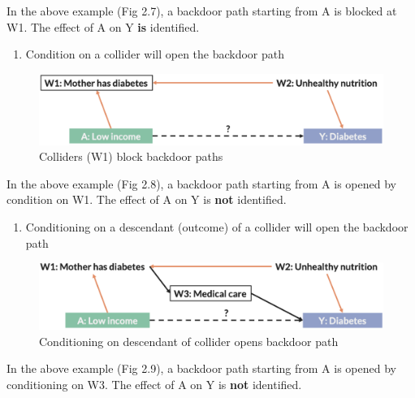 \documentclass[
]{book}
\providecommand{\tightlist}{%
  \setlength{\itemsep}{0pt}\setlength{\parskip}{0pt}}
\begin{document}
In the above example (Fig 2.7), a backdoor path starting from A is blocked at W1. The effect of A on Y \textbf{is} identified.

\begin{enumerate}
\def\labelenumi{\arabic{enumi}.}
\setcounter{enumi}{4}
\tightlist
\item
  Condition on a collider will open the backdoor path
\end{enumerate}

\begin{figure}

{\centering \includegraphics[width=1\linewidth]{img/confounding/dag_rules_5} 

}

\caption{Colliders (W1) block backdoor paths}\label{fig:unnamed-chunk-17}
\end{figure}

In the above example (Fig 2.8), a backdoor path starting from A is opened by condition on W1. The effect of A on Y is \textbf{not} identified.

\begin{enumerate}
\def\labelenumi{\arabic{enumi}.}
\setcounter{enumi}{5}
\tightlist
\item
  Conditioning on a descendant (outcome) of a collider will open the backdoor path
\end{enumerate}

\begin{figure}

{\centering \includegraphics[width=1\linewidth]{img/confounding/dag_rules_6} 

}

\caption{Conditioning on descendant of collider opens backdoor path}\label{fig:unnamed-chunk-18}
\end{figure}

In the above example (Fig 2.9), a backdoor path starting from A is opened by conditioning on W3. The effect of A on Y is \textbf{not} identified.
\end{document}
